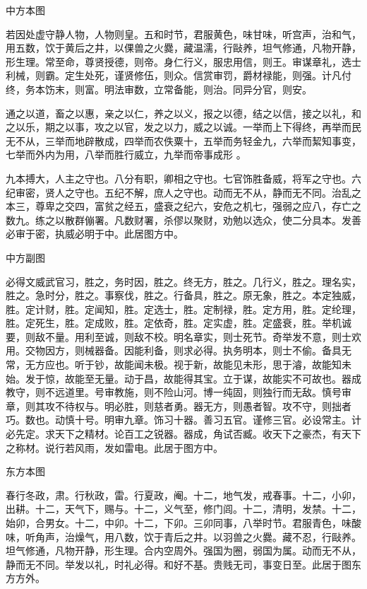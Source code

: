 \documentclass[]{article}
\begin{document}
中方本图

若因处虚守静人物，人物则皇。五和时节，君服黄色，味甘味，听宫声，治和气，用五数，饮于黄后之井，以倮兽之火爨，藏温濡，行敺养，坦气修通，凡物开静，形生理。常至命，尊贤授德，则帝。身仁行义，服忠用信，则王。审谋章礼，选士利械，则霸。定生处死，谨贤修伍，则众。信赏审罚，爵材禄能，则强。计凡付终，务本饬末，则富。明法审数，立常备能，则治。同异分官，则安。

通之以道，畜之以惠，亲之以仁，养之以义，报之以德，结之以信，接之以礼，和之以乐，期之以事，攻之以官，发之以力，威之以诚。一举而上下得终，再举而民无不从，三举而地辟散成，四举而农佚粟十，五举而务轻金九，六举而絜知事变，七举而外内为用，八举而胜行威立，九举而帝事成形
。

九本搏大，人主之守也。八分有职，卿相之守也。七官饰胜备威，将军之守也。六纪审密，贤人之守也。五纪不解，庶人之守也。动而无不从，静而无不同。治乱之本三，尊卑之交四，富贫之经五，盛衰之纪六，安危之机七，强弱之应八，存亡之数九。练之以散群傰署。凡数财署，杀僇以聚财，劝勉以选众，使二分具本。发善必审于密，执威必明于中。此居图方中。

中方副图

必得文威武官习，胜之，务时因，胜之。终无方，胜之。几行义，胜之。理名实，胜之。急时分，胜之。事察伐，胜之。行备具，胜之。原无象，胜之。本定独威，胜。定计财，胜。定闻知，胜。定选士，胜。定制禄，胜。定方用，胜。定纶理，胜。定死生，胜。定成败，胜。定依奇，胜。定实虚，胜。定盛衰，胜。举机诚要，则敌不量。用利至诚，则敌不校。明名章实，则士死节。奇举发不意，则士欢用。交物因方，则械器备。因能利备，则求必得。执务明本，则士不偷。备具无常，无方应也。听于钞，故能闻未极。视于新，故能见未形，思于濬，故能知未始。发于惊，故能至无量。动于昌，故能得其宝。立于谋，故能实不可故也。器成教守，则不远道里。号审教施，则不险山河。博一纯固，则独行而无敌。慎号审章，则其攻不待权与。明必胜，则慈者勇。器无方，则愚者智。攻不守，则拙者巧。数也。动慎十号。明审九章。饰习十器。善习五官。谨修三官。必设常主。计必先定。求天下之精材。论百工之锐器。器成，角试否臧。收天下之豪杰，有天下之称材。说行若风雨，发如雷电。此居于图方中。

东方本图

春行冬政，肃。行秋政，雷。行夏政，阉。十二，地气发，戒春事。十二，小卯，出耕。十二，天气下，赐与。十二，义气至，修门闾。十二，清明，发禁。十二，始卯，合男女。十二，中卯。十二，下卯。三卯同事，八举时节。君服青色，味酸味，听角声，治燥气，用八数，饮于青后之井。以羽兽之火爨。藏不忍，行敺养。坦气修通，凡物开静，形生理。合内空周外。强国为圈，弱国为属。动而无不从，静而无不同。举发以礼，时礼必得。和好不基。贵贱无司，事变日至。此居于图东方方外。
\end{document}
